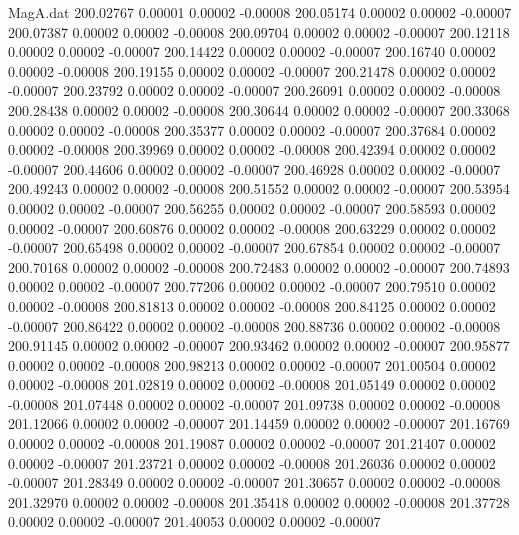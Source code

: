 \begin{filecontents}{MagA.dat}
 200.02767    0.00001    0.00002   -0.00008
 200.05174    0.00002    0.00002   -0.00007
 200.07387    0.00002    0.00002   -0.00008
 200.09704    0.00002    0.00002   -0.00007
 200.12118    0.00002    0.00002   -0.00007
 200.14422    0.00002    0.00002   -0.00007
 200.16740    0.00002    0.00002   -0.00008
 200.19155    0.00002    0.00002   -0.00007
 200.21478    0.00002    0.00002   -0.00007
 200.23792    0.00002    0.00002   -0.00007
 200.26091    0.00002    0.00002   -0.00008
 200.28438    0.00002    0.00002   -0.00008
 200.30644    0.00002    0.00002   -0.00007
 200.33068    0.00002    0.00002   -0.00008
 200.35377    0.00002    0.00002   -0.00007
 200.37684    0.00002    0.00002   -0.00008
 200.39969    0.00002    0.00002   -0.00008
 200.42394    0.00002    0.00002   -0.00007
 200.44606    0.00002    0.00002   -0.00007
 200.46928    0.00002    0.00002   -0.00007
 200.49243    0.00002    0.00002   -0.00008
 200.51552    0.00002    0.00002   -0.00007
 200.53954    0.00002    0.00002   -0.00007
 200.56255    0.00002    0.00002   -0.00007
 200.58593    0.00002    0.00002   -0.00007
 200.60876    0.00002    0.00002   -0.00008
 200.63229    0.00002    0.00002   -0.00007
 200.65498    0.00002    0.00002   -0.00007
 200.67854    0.00002    0.00002   -0.00007
 200.70168    0.00002    0.00002   -0.00008
 200.72483    0.00002    0.00002   -0.00007
 200.74893    0.00002    0.00002   -0.00007
 200.77206    0.00002    0.00002   -0.00007
 200.79510    0.00002    0.00002   -0.00008
 200.81813    0.00002    0.00002   -0.00008
 200.84125    0.00002    0.00002   -0.00007
 200.86422    0.00002    0.00002   -0.00008
 200.88736    0.00002    0.00002   -0.00008
 200.91145    0.00002    0.00002   -0.00007
 200.93462    0.00002    0.00002   -0.00007
 200.95877    0.00002    0.00002   -0.00008
 200.98213    0.00002    0.00002   -0.00007
 201.00504    0.00002    0.00002   -0.00008
 201.02819    0.00002    0.00002   -0.00008
 201.05149    0.00002    0.00002   -0.00008
 201.07448    0.00002    0.00002   -0.00007
 201.09738    0.00002    0.00002   -0.00008
 201.12066    0.00002    0.00002   -0.00007
 201.14459    0.00002    0.00002   -0.00007
 201.16769    0.00002    0.00002   -0.00008
 201.19087    0.00002    0.00002   -0.00007
 201.21407    0.00002    0.00002   -0.00007
 201.23721    0.00002    0.00002   -0.00008
 201.26036    0.00002    0.00002   -0.00007
 201.28349    0.00002    0.00002   -0.00007
 201.30657    0.00002    0.00002   -0.00008
 201.32970    0.00002    0.00002   -0.00008
 201.35418    0.00002    0.00002   -0.00008
 201.37728    0.00002    0.00002   -0.00007
 201.40053    0.00002    0.00002   -0.00007

\end{filecontents}
